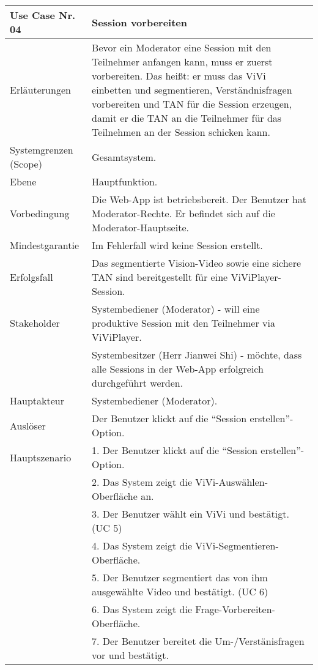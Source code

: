 \begin{tabularx}{\linewidth}{|l|X|}
	\hline
	Use Case Nr. 04			& \textbf{Session vorbereiten} \\ \hline
	Erläuterungen			& Bevor ein Moderator eine Session mit den Teilnehmer anfangen 
	                          kann, muss er zuerst vorbereiten. Das heißt: er muss das ViVi einbetten und segmentieren, Verständnisfragen vorbereiten und TAN für die Session erzeugen, damit er die TAN an die Teilnehmer für das Teilnehmen an der Session schicken kann. \\ \hline
	Systemgrenzen (Scope)	& Gesamtsystem. \\ \hline
	Ebene					& Hauptfunktion. \\ \hline
	Vorbedingung			& Die Web-App ist betriebsbereit. Der Benutzer hat 
	                          Moderator-Rechte. Er befindet sich auf die Moderator-Hauptseite. \\ \hline
	Mindestgarantie			& Im Fehlerfall wird keine Session erstellt.\\ \hline
	Erfolgsfall  			& Das segmentierte Vision-Video sowie eine sichere TAN sind 
	                          bereitgestellt für eine ViViPlayer-Session. \\ \hline
	Stakeholder				& Systembediener (Moderator) - will eine produktive Session mit den 
	                          Teilnehmer via ViViPlayer. \\
							& Systembesitzer (Herr Jianwei Shi) - möchte, dass alle Sessions 
							  in der Web-App erfolgreich durchgeführt werden. \\ \hline
	Hauptakteur				& Systembediener (Moderator). \\ \hline
	Auslöser				& Der Benutzer klickt auf die ``Session erstellen''-Option. \\ \hline	
	Hauptszenario			& 1. Der Benutzer klickt auf die ``Session erstellen''-Option. \\ 
							& 2. Das System zeigt die ViVi-Auswählen-Oberfläche an. \\
							& 3. Der Benutzer wählt ein ViVi und bestätigt. (UC 5) \\ 
							& 4. Das System zeigt die ViVi-Segmentieren-Oberfläche. \\ 
							& 5. Der Benutzer segmentiert das von ihm ausgewählte Video und 
							  bestätigt. (UC 6) \\
							& 6. Das System zeigt die Frage-Vorbereiten-Oberfläche. \\
							& 7. Der Benutzer bereitet die Um-/Verstänisfragen vor und bestätigt.

\end{tabularx}
